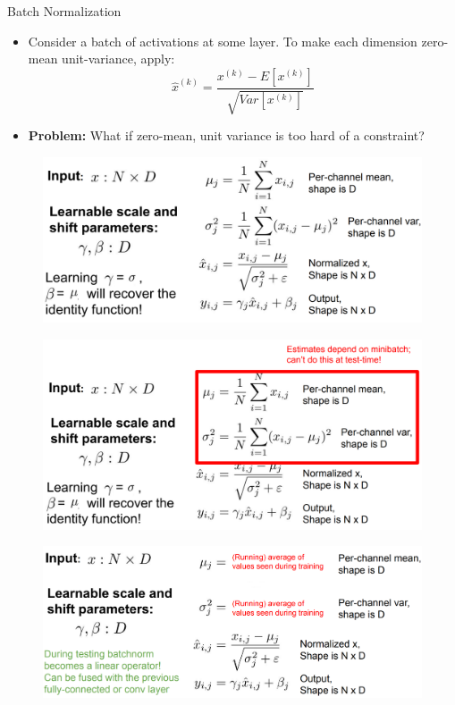 \begin{frame}[allowframebreaks]{Batch Normalization}
    \begin{itemize}
        \item Consider a batch of activations at some layer. To make each dimension zero-mean unit-variance, apply:
        $$\hat{x}^{(k)} = \frac{x^{(k)} - E[x^{(k)}]}{\sqrt{Var[x^{(k)}]}}$$
        \pause
        \item \textbf{Problem:} What if zero-mean, unit variance is too hard of a constraint?
    \end{itemize}
\framebreak
    \begin{figure}
    \centering
    \includegraphics[width=1.0\textwidth,height=0.9\textheight,keepaspectratio]{images/cnn/batch_norm_1.png}
    \end{figure}
\framebreak
    \begin{figure}
    \centering
    \includegraphics[width=1.0\textwidth,height=0.9\textheight,keepaspectratio]{images/cnn/batch_norm_2.png}
    \end{figure}
\framebreak
    \begin{figure}
    \centering
    \includegraphics[width=1.0\textwidth,height=0.9\textheight,keepaspectratio]{images/cnn/batch_norm_3.png}

\end{figure}
\end{frame}
